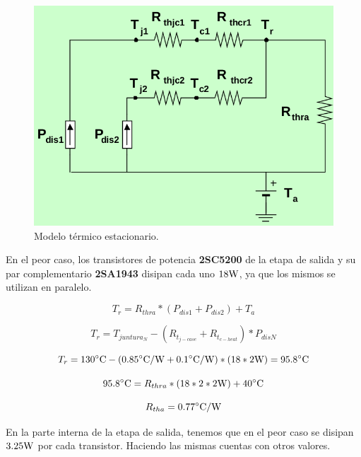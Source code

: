
\label{sec:disipadores}
\begin{figure}[H]
    \centering
    \includegraphics[height=0.4\textwidth]{img/calculo_disipador.png}
    \caption{Modelo térmico estacionario.}
    \label{fig:disipadores}
\end{figure}

En el peor caso, los transistores de potencia \textbf{2SC5200} de la etapa de salida y su par complementario \textbf{2SA1943} disipan cada uno $18 \si[per-mode=symbol]{\watt}$, ya que los mismos se utilizan en paralelo.

\begin{equation*}
T_r = R_{thra} * (P_{dis1}+P_{dis2}) + T_a
\end{equation*}

\begin{equation*}
T_r = T_{juntura_{N}} - (R_{t_{j-case}}+R_{t_{c-heat}})*P_{disN}
\end{equation*}

\begin{equation*}
T_r = 130 \si[per-mode=symbol]{\celsius} - (0.85 \si[per-mode=symbol]{\celsius\per\watt} + 0.1 \si[per-mode=symbol]{\celsius\per\watt})*(18*2 \si[per-mode=symbol]{\watt}) = 95.8 \si[per-mode=symbol]{\celsius}
\end{equation*}

\begin{equation*}
95.8 \si[per-mode=symbol]{\celsius} = R_{thra}*(18*2*2 \si[per-mode=symbol]{\watt}) + 40 \si[per-mode=symbol]{\celsius}
\end{equation*}

\begin{equation*}
R_{tha} = 0.77 \si[per-mode=symbol]{\celsius\per\watt}
\end{equation*}

En la  parte interna de la etapa de salida, tenemos que en el peor caso se disipan $3.25 \si[per-mode=symbol]{\watt}$ por cada transistor. Haciendo las mismas cuentas con otros valores.


